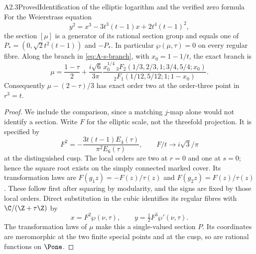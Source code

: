 \begin{claim}{A2.3}{Proved}{Identification of the elliptic logarithm and the verified zero formula}
For the Weierstrass equation
\[
y^2=x^3-3t^3(t-1)x+2t^4(t-1)^2,
\]
the section $[\mu]$ is a generator of its rational section group and
equals one of $P_*=(0,\sqrt2t^2(t-1))$ and $-P_*$.
In particular $\wp(\mu,\tau)=0$ on every regular fibre.
Along the branch in \eqref{eq:A-s-branch}, with
$x_0=1-1/t$, the exact branch is
\begin{equation}\label{eq:A-DI-branch}
\mu=\frac{1-\tau}{2}
 +\frac{i\sqrt6}{3\pi}
 \frac{x_0^{1/4}\,{}_3F_2(1/3,2/3,1;3/4,5/4;x_0)}
 {{}_2F_1(1/12,5/12;1;1-x_0)}.
\end{equation}
Consequently $\mu-(2-\tau)/3$ has exact order two at the
order-three point in $r^3=t$.
\end{claim}
\begin{proof}
We include the comparison, since a matching $j$-map alone would not
identify a section.  Write $F$ for the elliptic scale, not the
threefold projection.  It is specified by
\[
F^2=-\frac{3t(t-1)E_4(\tau)}{\pi^2E_6(\tau)},\qquad
F/t\longrightarrow i\sqrt3/\pi
\]
at the distinguished cusp.  The local orders are two at $r=0$ and
one at $s=0$; hence the square root exists on the simply connected
marked cover.  Its transformation laws are
$F(g_1z)=-F(z)/\tau(z)$ and $F(g_2z)=F(z)/\tau(z)$.
These follow first after squaring by modularity, and the signs are
fixed by those local orders.  Direct substitution in the cubic
identifies its regular fibres with $\C/(\Z+\tau\Z)$ by
\[
x=F^2\wp(\nu,\tau),\qquad y=\tfrac12F^3\wp'(\nu,\tau).
\]
The transformation laws of $\mu$ make this a single-valued section
$P$.  Its coordinates are meromorphic at the two finite special
points and at the cusp, so are rational functions on $\Pone$.


\end{proof}
